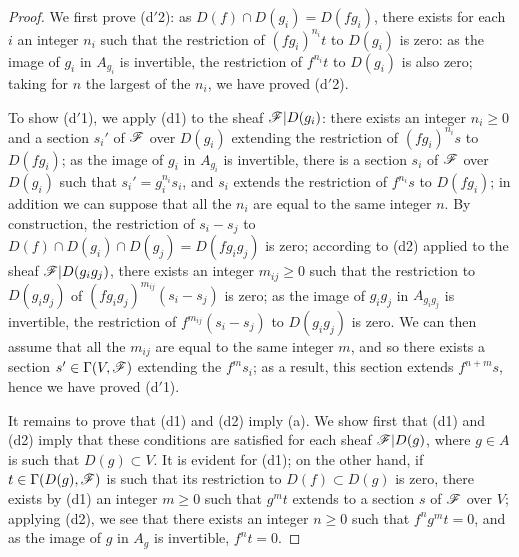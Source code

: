 \begin{proof}
We first prove (d$'$2): as $D(f)\cap D(g_i)=D(fg_i)$, there exists for each $i$ an integer
$n_i$ such that the restriction of $(fg_i)^{n_i}t$ to $D(g_i)$ is zero: as the image of $g_i$
in $A_{g_i}$ is invertible, the restriction of $f^{n_i}t$ to $D(g_i)$ is also zero; taking
for $n$ the largest of the $n_i$, we have proved (d$'$2).

To show (d$'$1), we apply (d1) to the sheaf $\mathscr{F}|D(g_i)$: there exists an integer
$n_i\geqslant 0$ and a section $s_i'$ of $\mathscr{F}$ over $D(g_i)$ extending the restriction of
$(fg_i)^{n_i}s$ to $D(fg_i)$; as the image of $g_i$ in $A_{g_i}$ is invertible, there is a
section $s_i$ of $\mathscr{F}$ over $D(g_i)$ such that $s_i'=g_i^{n_i}s_i$, and $s_i$ extends the
restriction of $f^{n_i}s$ to $D(fg_i)$; in addition we can suppose that all the $n_i$ are
equal to the same integer $n$. By construction, the restriction of $s_i-s_j$ to
$D(f)\cap D(g_i)\cap D(g_j)=D(fg_i g_j)$ is zero; according to (d2) applied to the sheaf
$\mathscr{F}|D(g_i g_j)$, there exists an integer $m_{ij}\geqslant 0$ such that the restriction to
$D(g_i g_j)$ of $(fg_i g_j)^{m_{ij}}(s_i-s_j)$ is zero; as the image of $g_i g_j$ in
$A_{g_i g_j}$ is invertible, the restriction of $f^{m_{ij}}(s_i-s_j)$ to $D(g_i g_j)$ is
zero. We can then assume that all the $m_{ij}$ are equal to the same integer $m$, and so
there exists a section $s'\in\Gamma(V,\mathscr{F})$ extending the $f^m s_i$; as a result, this
section extends $f^{n+m}s$, hence we have proved (d$'$1).

It remains to prove that (d1) and (d2) imply (a). We show first that (d1) and (d2) imply that
these conditions are satisfied for each sheaf $\mathscr{F}|D(g)$, where $g\in A$ is such that
$D(g)\subset V$. It is evident for (d1); on the other hand, if $t\in\Gamma(D(g),\mathscr{F})$ is
such that its restriction to $D(f)\subset D(g)$ is zero, there exists by (d1) an integer
$m\geqslant 0$ such that $g^m t$
extends to a section $s$ of $\mathscr{F}$ over $V$; applying (d2), we see that there exists an
integer $n\geqslant 0$ such that $f^n g^m t=0$, and as the image of $g$ in $A_g$ is
invertible, $f^n t=0$.


\end{proof}
